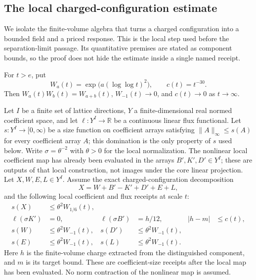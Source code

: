 \subsection{The local charged-configuration estimate}
\label{sec:ex-lattice-trace-local-charge}

We isolate the finite-volume algebra that turns a charged configuration
into a bounded field and a priced response. This is the local step used
before the separation-limit passage. Its quantitative premises are stated
as component bounds, so the proof does not hide the estimate inside a
single named receipt.

For $t>e$, put
\[
 W_a(t)=\exp\bigl(a(\log\log t)^2\bigr),
 \qquad c(t)=t^{-30}.
\]
Then $W_a(t)W_b(t)=W_{a+b}(t)$, $W_{-1}(t)\to0$, and $c(t)\to0$ as
$t\to\infty$.

Let $I$ be a finite set of lattice directions, $Y$ a finite-dimensional
real normed coefficient space, and let $\ell:Y^I\to\mathbb R$ be a
continuous linear flux functional. Let $s:Y^I\to[0,\infty)$ be a size
function on coefficient arrays satisfying
$\|A\|_\infty\le s(A)$ for every coefficient array $A$; this domination is
the only property of $s$ used below. Write
$\sigma=\theta^{-2}$ with $\theta>0$ for the local normalization. The
nonlinear local coefficient map has already been evaluated in the arrays
$B',K',D'\in Y^I$; these are outputs of that local construction, not images
under the core linear projection. Let $X,W,E,L\in Y^I$. Assume the exact
charged-configuration decomposition
\begin{equation}
 X=W+B'-K'+D'+E+L,
 \label{eq:ex-lattice-charge-decomposition}
\end{equation}
and the following local coefficient and flux receipts at scale $t$:
\begin{align}
 s(X)&\le\theta^2 W_{1/6}(t),
 \label{eq:ex-lattice-charge-size-input}\\
 \ell(\sigma K')&=0,
 &\ell(\sigma B')&=h/12,
 &|h-m|&\le c(t),
 \label{eq:ex-lattice-charge-price-identities}\\
 s(W)&\le\theta^2 W_{-1}(t),
 &s(D')&\le\theta^2 W_{-1}(t),
 \label{eq:ex-lattice-charge-error-one}\\
 s(E)&\le\theta^2 W_{-1}(t),
 &s(L)&\le\theta^2 W_{-1}(t).
 \label{eq:ex-lattice-charge-error-two}
\end{align}
Here $h$ is the finite-volume charge extracted from the distinguished
component, and $m$ is its target bound. These are coefficient-size receipts
after the local map has been evaluated. No norm contraction of the nonlinear
map is assumed.


